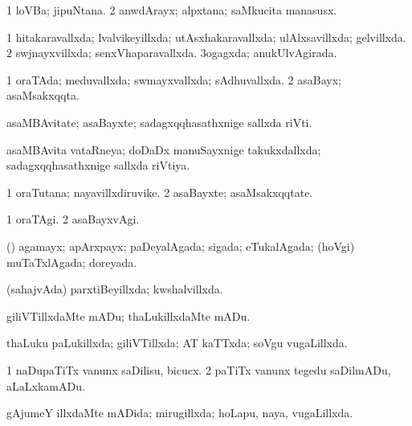 {\bentry
{} 
\gl{\nA}
\expl{}
\bmng
\bnum
\num{1} loVBa; jipuNtana. 
\num{2} anwdArayx; alpxtana; saMkucita manasusx. 
\enum
\emng
\eentry

\bentry
{} 
\gl{\gu}
\expl{}
\bmng
\bnum
\num{1} hitakaravallxda; lvalvikeyillxda; utAsxhakaravallxda; ulAlxsavillxda; gelvillxda. 
\num{2} swjnayxvillxda; senxVhaparavallxda. 
\num{3}ogagxda; anukUlvAgirada. 
\enum
\emng
\eentry

\bentry
{} 
\gl{\gu}
\expl{}
\bmng
\bnum
\num{1} oraTAda; meduvallxda; swmayxvallxda; sAdhuvallxda. 
\num{2} asaBayx; asaMsakxqqta. 
\enum
\emng
\eentry

\bentry
{} 
\gl{\nA}
\expl{}
\bmng
 asaMBAvitate; asaBayxte; sadagxqqhasathxnige sallxda riVti. 
\emng
\eentry

\bentry
{} 
\gl{\gu}
\expl{}
\bmng
 asaMBAvita vataRneya; doDaDx manuSayxnige takukxdallxda; sadagxqqhasathxnige sallxda riVtiya. 
\emng
\eentry

\bentry
{} 
\gl{\nA}
\expl{}
\bmng
\bnum
\num{1} oraTutana; nayavillxdiruvike. 
\num{2} asaBayxte; asaMsakxqqtate. 
\enum
\emng
\eentry

\bentry
{} 
\gl{\kirxvi}
\bmng
\bnum
\num{1} oraTAgi. 
\num{2} asaBayxvAgi. 
\enum
\emng
\eentry

\bentry
{} 
\gl{\gu}
\expl{}
\bmng
 (\AmA) agamayx; apArxpayx; paDeyalAgada; sigada; eTukalAgada; (hoVgi) muTaTxlAgada; doreyada. 
\emng
\eentry

\bentry
{} 
\gl{\gu}
\expl{}
\bmng
 (sahajvAda) parxtiBeyillxda; kwshalvillxda. 
\emng
\eentry

\bentry
{} 
\gl{\akirx}
\expl{}
\bmng
 giliVTillxdaMte mADu; thaLukillxdaMte mADu. 
\emng
\eentry

\bentry
{} 
\gl{\gu}
\expl{}
\bmng
 thaLuku paLukillxda; giliVTillxda; AT kaTTxda; soVgu \mo vugaLillxda. 
\emng
\eentry

\bentry
{} 
\gl{\sakirx}
\expl{}
\bmng
\bnum
\num{1} naDupaTiTx \mo vanunx saDilisu, bicucx. 
\num{2} paTiTx \mo vanunx tegedu saDilmADu, aLaLxkamADu. 
\enum
\emng
\eentry

\bentry
{} 
\gl{\gu}
\expl{}
\bmng
gAjumeY illxdaMte mADida; mirugillxda; hoLapu, naya, \mo vugaLillxda. 
\emng
\eentry

}
